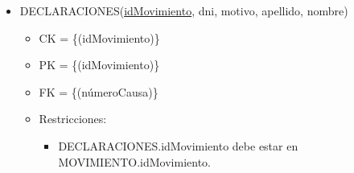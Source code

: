 \begin{itemize}
\item DECLARACIONES(\underline{idMovimiento}, dni, motivo, apellido, nombre)
	\begin{itemize}
		\item CK = \{(idMovimiento)\}
		\item PK = \{(idMovimiento)\}
		\item FK = \{(númeroCausa)\}
		\item Restricciones:
			\begin{itemize}
			\item DECLARACIONES.idMovimiento debe estar en MOVIMIENTO.idMovimiento.
			\\
			\end{itemize}
	\end{itemize}
	
	
\end{itemize}		